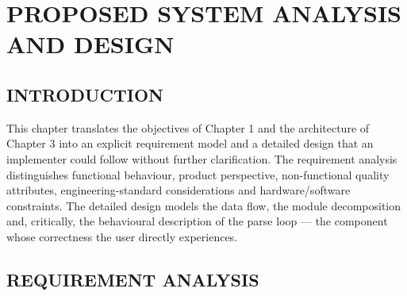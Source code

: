 \documentclass[12pt,a4paper,oneside,openany]{report}
\begin{document}



\chapter{PROPOSED SYSTEM ANALYSIS AND DESIGN}

\section{INTRODUCTION}
This chapter translates the objectives of Chapter 1 and the architecture of
Chapter 3 into an explicit requirement model and a detailed design that an
implementer could follow without further clarification. The requirement
analysis distinguishes functional behaviour, product perspective,
non-functional quality attributes, engineering-standard considerations and
hardware/software constraints. The detailed design models the data flow,
the module decomposition and, critically, the behavioural description of
the parse loop --- the component whose correctness the user directly
experiences.

\section{REQUIREMENT ANALYSIS}
\end{document}
